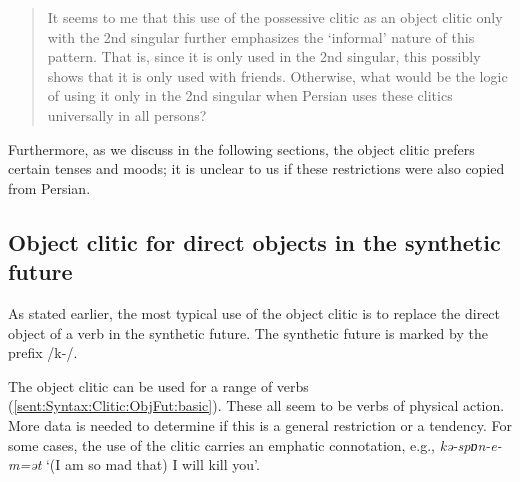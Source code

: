 \begin{quote}
		It seems to me that  this use of the possessive clitic as an object clitic only with the 2nd singular further emphasizes the `informal' nature of this pattern. That is, since it is only used in the 2nd singular, this possibly shows that it is only used with friends. Otherwise, what would be the logic of using it only in the 2nd singular when Persian uses these clitics universally in all persons?\end{quote} 

Furthermore,  as we discuss in the following sections, the object clitic prefers certain tenses and moods; it is unclear to us if these restrictions were also copied from Persian. 




\subsection{Object clitic for direct objects in the synthetic future}\label{section:syntax:clitic:future}
As stated earlier, the most typical use of the object clitic is to replace the direct object of a verb in the synthetic future. The synthetic future is marked by the prefix /{k-}/. 



The object clitic can be used for a range of verbs (\ref{sent:Syntax:Clitic:ObjFut:basic}). These all seem to be verbs of physical action. More data is needed to determine if this is a general restriction or a  tendency. For some cases, the use of the clitic carries an emphatic connotation, e.g., \textit{{kə-spɒn-e-m=ət}} `(I am so mad that) I {will} kill you’.

